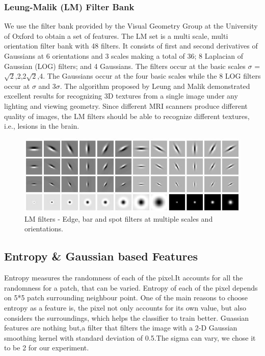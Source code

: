 \documentclass{article} %
\begin{document}
\subsubsection{Leung-Malik (LM) Filter Bank}
We use the filter bank provided by the Visual Geometry Group at the University of Oxford to obtain a set of features. The LM set is a multi scale, multi orientation filter bank with 48 filters. It consists of first and second derivatives of Gaussians at 6 orientations and 3 scales making a total of 36; 8 Laplacian of Gaussian (LOG) filters; and 4 Gaussians. The filters occur at the basic scales $\sigma$ = {$\sqrt{2}$,2,2$\sqrt{2}$,4}. The Gaussians occur at the four basic scales while the 8 LOG filters occur at $\sigma$ and 3$\sigma$. The algorithm proposed by Leung and Malik \cite{LMfilters} demonstrated excellent
results for recognizing 3D textures from a single image under any lighting and viewing geometry. Since different MRI scanners produce different quality of images, the LM filters should be able to recognize different textures, i.e., lesions in the brain.
\begin{figure}[h]
\centering
\includegraphics[scale=0.3]{lmfilters.jpg}
\caption{LM filters - Edge, bar and spot filters at multiple scales and orientations.}
\label{fig:LM filters}
\end{figure}

\subsection{Entropy \& Gaussian based Features}

Entropy measures the randomness of each of the pixel.It accounts for all the randomness for a patch, that can be varied. Entropy of each of the pixel depends on 5*5 patch surrounding neighbour point. One of the main reasons to choose entropy as a feature is, the pixel not only accounts for its own value, but also considers the surroundings, which helps the classifier to train better.
Guassian features are nothing but,a filter  that filters the image with a 2-D Gaussian smoothing kernel with standard deviation of 0.5.The sigma can vary, we chose it to be 2 for our experiment.
\end{document}
